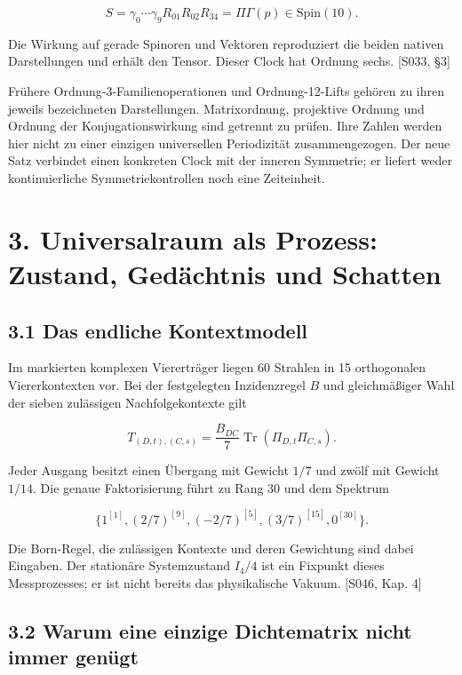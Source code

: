 \[S=\gamma_0\cdots\gamma_9R_{01}R_{02}R_{34}
=\Pi\Gamma(p)\in\mathrm{Spin}(10).\]

Die Wirkung auf gerade Spinoren und Vektoren reproduziert die beiden
nativen Darstellungen und erhält den Tensor. Dieser Clock hat Ordnung
sechs. {[}S033, §3{]}

Frühere Ordnung-3-Familienoperationen und Ordnung-12-Lifts gehören zu
ihren jeweils bezeichneten Darstellungen. Matrixordnung, projektive
Ordnung und Ordnung der Konjugationswirkung sind getrennt zu prüfen.
Ihre Zahlen werden hier nicht zu einer einzigen universellen
Periodizität zusammengezogen. Der neue Satz verbindet einen konkreten
Clock mit der inneren Symmetrie; er liefert weder kontinuierliche
Symmetriekontrollen noch eine Zeiteinheit.

\section{3. Universalraum als Prozess: Zustand, Gedächtnis und
Schatten}\label{universalraum-als-prozess-zustand-geduxe4chtnis-und-schatten}

\subsection{3.1 Das endliche
Kontextmodell}\label{das-endliche-kontextmodell}

Im markierten komplexen Viererträger liegen 60 Strahlen in 15
orthogonalen Viererkontexten vor. Bei der festgelegten Inzidenzregel
\(B\) und gleichmäßiger Wahl der sieben zulässigen Nachfolgekontexte
gilt

\[
T_{(D,t),(C,s)}=\frac{B_{DC}}7
\operatorname{Tr}(\Pi_{D,t}\Pi_{C,s}).
\]

Jeder Ausgang besitzt einen Übergang mit Gewicht \(1/7\) und zwölf mit
Gewicht \(1/14\). Die genaue Faktorisierung führt zu Rang 30 und dem
Spektrum

\[\{1^{[1]},(2/7)^{[9]},(-2/7)^{[5]},(3/7)^{[15]},0^{[30]}\}.\]

Die Born-Regel, die zulässigen Kontexte und deren Gewichtung sind dabei
Eingaben. Der stationäre Systemzustand \(I_4/4\) ist ein Fixpunkt dieses
Messprozesses; er ist nicht bereits das physikalische Vakuum. {[}S046,
Kap. 4{]}

\subsection{3.2 Warum eine einzige Dichtematrix nicht immer
genügt}\label{warum-eine-einzige-dichtematrix-nicht-immer-genuxfcgt}

